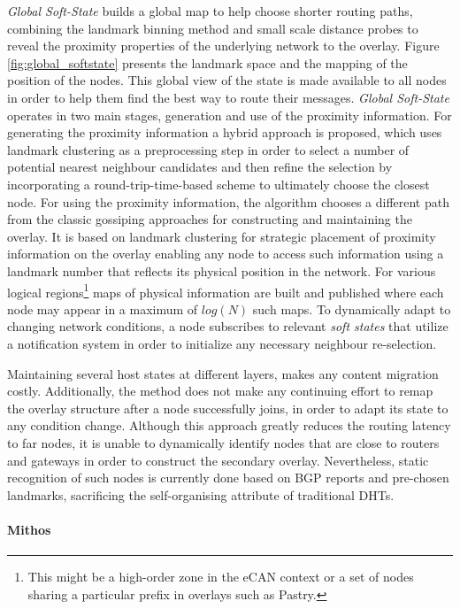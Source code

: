 \documentclass[acmcsur,acmnow]{acmtrans2m}
\begin{document}
\textit{Global Soft-State} \cite{xu_globstate_2003} builds a global map to help
choose shorter routing paths, combining the landmark binning method and small
scale distance probes to reveal the proximity properties of the underlying
network to the overlay. Figure \ref{fig:global_softstate} presents the landmark space and the mapping of the position of the nodes. This global view of the state is made available to all
nodes in order to help them find the best way to route their messages.
\textit{Global Soft-State} operates in two main stages, generation and use of
the proximity information. For generating the proximity information a hybrid
approach is proposed, which uses landmark clustering as a preprocessing step in
order to select a number of potential nearest neighbour candidates and then
refine the selection by incorporating a round-trip-time-based scheme to ultimately choose the
closest node. For using the proximity information, the algorithm chooses a
different path from the classic gossiping approaches for constructing and
maintaining the overlay. It is based on landmark clustering for strategic
placement of proximity information on the overlay enabling any node to access
such information using a landmark number that reflects its physical position in
the network. For various logical regions\footnote{This might be a high-order
zone in the eCAN\cite{xu_ecan_2002} context or a set of nodes sharing a
particular prefix in overlays such as Pastry.} maps of physical information are
built and published where each node may appear in a maximum of $log\left( N
\right)$ such maps. To dynamically adapt to changing network conditions, a node
subscribes to relevant \emph{soft states} that utilize a notification system in
order to initialize any necessary neighbour re-selection.

Maintaining several host states at different layers, makes any content migration
costly. Additionally, the method does not make any continuing effort to remap the
overlay structure after a node successfully joins, in order to adapt its state to
any condition change. Although this approach greatly reduces the
routing latency to far nodes, it is unable to dynamically identify nodes that are
close to routers and gateways in order to construct the secondary overlay.
Nevertheless, static recognition of such nodes is currently done based on BGP
reports and pre-chosen landmarks, sacrificing the self-organising attribute of
traditional DHTs.

\paragraph*{\bf Mithos}
\end{document}
